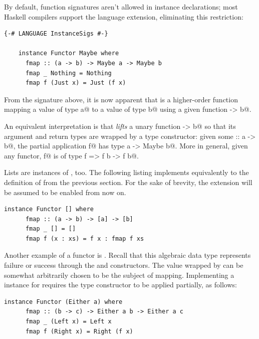 \documentclass[UdineBachThesis,american,11pt,draft]{PhdThesis}
\begin{document}
  By default, function signatures aren't allowed in instance declarations; most
  Haskell compilers support the \lstinline@InstanceSigs@ language extension,
  eliminating this restriction:

  \begin{lstlisting}[gobble=4,basicstyle=\ttfamily\small]
    {-# LANGUAGE InstanceSigs #-}

    instance Functor Maybe where
      fmap :: (a -> b) -> Maybe a -> Maybe b
      fmap _ Nothing = Nothing
      fmap f (Just x) = Just (f x)
  \end{lstlisting}

  From the signature above, it is now apparent that \lstinline@fmap@ is a
  higher-order function mapping a value of type \lstinline@Maybe a@ to a value
  of type \lstinline@Maybe b@ using a given function \lstinline@a -> b@.

  An equivalent interpretation is that \lstinline@fmap@ \emph{lifts} a unary
  function \lstinline@a -> b@ so that its argument and return types are wrapped
  by a \lstinline@Maybe@ type constructor: given some \lstinline@f :: a -> b@,
  the partial application \lstinline@fmap f@ has type
  \lstinline@Maybe a -> Maybe b@. More in general, given any functor,
  \lstinline@fmap f@ is of type \lstinline@Functor f => f b -> f b@.

  Lists are instances of \lstinline@Functor@, too. The following listing
  implements \lstinline@fmap@ equivalently to the definition of \lstinline@map@
  from the previous section. For the sake of brevity, the
  \lstinline@InstanceSigs@ extension will be assumed to be enabled from now on.

  \begin{lstlisting}[gobble=4,basicstyle=\ttfamily\small]
    instance Functor [] where
      fmap :: (a -> b) -> [a] -> [b]
      fmap _ [] = []
      fmap f (x : xs) = f x : fmap f xs
  \end{lstlisting}

  Another example of a functor is \lstinline@Either@. Recall that this algebraic
  data type represents failure or success through the \lstinline@Left@ and
  \lstinline@Right@ constructors. The value wrapped by \lstinline@Right@ can be
  somewhat arbitrarily chosen to be the subject of mapping. Implementing a
  \lstinline@Functor@ instance for requires the type constructor
  \lstinline@Either@ to be applied partially, as follows:

  \begin{lstlisting}[gobble=4,basicstyle=\ttfamily\small]
    instance Functor (Either a) where
      fmap :: (b -> c) -> Either a b -> Either a c
      fmap _ (Left x) = Left x
      fmap f (Right x) = Right (f x)
  \end{lstlisting}
\end{document}
